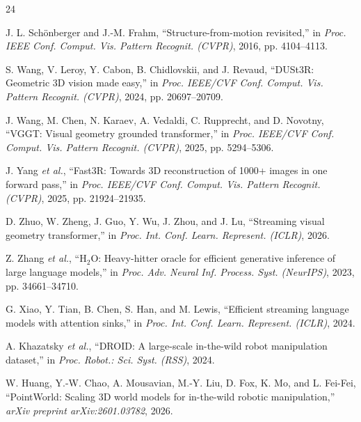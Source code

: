 \documentclass[10pt]{article}
\begin{document}
\begin{thebibliography}{24}

J. L. Sch\"onberger and J.-M. Frahm,
``Structure-from-motion revisited,'' in \textit{Proc. IEEE Conf. Comput. Vis.
Pattern Recognit. (CVPR)}, 2016, pp. 4104--4113.

S. Wang, V. Leroy, Y. Cabon, B. Chidlovskii, and J. Revaud,
``{DUSt3R}: Geometric {3D} vision made easy,'' in
\textit{Proc. IEEE/CVF Conf. Comput. Vis. Pattern Recognit. (CVPR)}, 2024,
pp. 20697--20709.

J. Wang, M. Chen, N. Karaev, A. Vedaldi, C. Rupprecht, and D. Novotny,
``{VGGT}: Visual geometry grounded transformer,'' in
\textit{Proc. IEEE/CVF Conf. Comput. Vis. Pattern Recognit. (CVPR)}, 2025,
pp. 5294--5306.

J. Yang \textit{et al.},
``{Fast3R}: Towards {3D} reconstruction of 1000+ images in one forward pass,''
in \textit{Proc. IEEE/CVF Conf. Comput. Vis. Pattern Recognit. (CVPR)}, 2025,
pp. 21924--21935.

D. Zhuo, W. Zheng, J. Guo, Y. Wu, J. Zhou, and J. Lu,
``Streaming visual geometry transformer,'' in
\textit{Proc. Int. Conf. Learn. Represent. (ICLR)}, 2026.

Z. Zhang \textit{et al.},
``{H$_2$O}: Heavy-hitter oracle for efficient generative inference of large
language models,'' in \textit{Proc. Adv. Neural Inf. Process. Syst.
(NeurIPS)}, 2023, pp. 34661--34710.

G. Xiao, Y. Tian, B. Chen, S. Han, and M. Lewis,
``Efficient streaming language models with attention sinks,'' in
\textit{Proc. Int. Conf. Learn. Represent. (ICLR)}, 2024.

A. Khazatsky \textit{et al.},
``{DROID}: A large-scale in-the-wild robot manipulation dataset,'' in
\textit{Proc. Robot.: Sci. Syst. (RSS)}, 2024.

W. Huang, Y.-W. Chao, A. Mousavian, M.-Y. Liu, D. Fox, K. Mo, and L. Fei-Fei,
``{PointWorld}: Scaling {3D} world models for in-the-wild robotic
manipulation,'' \textit{arXiv preprint arXiv:2601.03782}, 2026.


\end{thebibliography}
\end{document}
